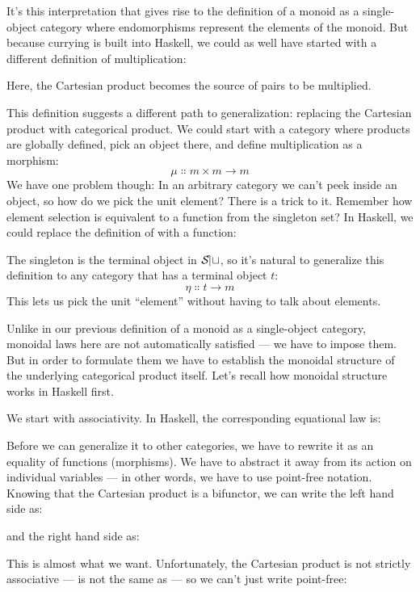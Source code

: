 It's this interpretation that gives rise to the definition of a monoid
as a single-object category where endomorphisms
 represent the elements of the monoid.
But because currying is built into Haskell, we could as well have
started with a different definition of multiplication:

Here, the Cartesian product  becomes the source of pairs
to be multiplied.

This definition suggests a different path to generalization: replacing
the Cartesian product with categorical product. We could start with a
category where products are globally defined, pick an object 
there, and define multiplication as a morphism:
\[\mu \Colon m\times{}m \to m\]
We have one problem though: In an arbitrary category we can't peek
inside an object, so how do we pick the unit element? There is a trick
to it. Remember how element selection is equivalent to a function from
the singleton set? In Haskell, we could replace the definition of
 with a function:

The singleton is the terminal object in $\mathcal{S\mkern-3mu et}$, so it's natural to
generalize this definition to any category that has a terminal object
$t$:
\[\eta \Colon t \to m\]
This lets us pick the unit ``element'' without having to talk about
elements.

Unlike in our previous definition of a monoid as a single-object
category, monoidal laws here are not automatically satisfied --- we have
to impose them. But in order to formulate them we have to establish the
monoidal structure of the underlying categorical product itself. Let's
recall how monoidal structure works in Haskell first.

We start with associativity. In Haskell, the corresponding equational
law is:

Before we can generalize it to other categories, we have to rewrite it
as an equality of functions (morphisms). We have to abstract it away
from its action on individual variables --- in other words, we have to
use point-free notation. Knowing that the Cartesian product is a
bifunctor, we can write the left hand side as:

and the right hand side as:

This is almost what we want. Unfortunately, the Cartesian product is not
strictly associative ---  is not the same as
 --- so we can't just write point-free:


